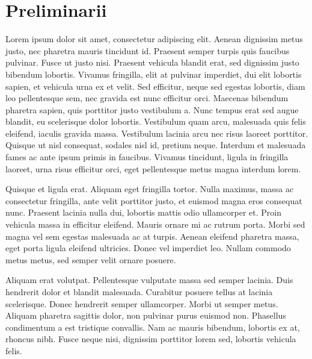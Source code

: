 \section{Preliminarii}

Lorem ipsum dolor sit amet, consectetur adipiscing elit. Aenean dignissim metus justo, nec pharetra mauris tincidunt id. Praesent semper turpis quis faucibus pulvinar. Fusce ut justo nisi. Praesent vehicula blandit erat, sed dignissim justo bibendum lobortis. Vivamus fringilla, elit at pulvinar imperdiet, dui elit lobortis sapien, et vehicula urna ex et velit. Sed efficitur, neque sed egestas lobortis, diam leo pellentesque sem, nec gravida est nunc efficitur orci. Maecenas bibendum pharetra sapien, quis porttitor justo vestibulum a. Nunc tempus erat sed augue blandit, eu scelerisque dolor lobortis. Vestibulum quam arcu, malesuada quis felis eleifend, iaculis gravida massa. Vestibulum lacinia arcu nec risus laoreet porttitor. Quisque ut nisl consequat, sodales nisl id, pretium neque. Interdum et malesuada fames ac ante ipsum primis in faucibus. Vivamus tincidunt, ligula in fringilla laoreet, urna risus efficitur orci, eget pellentesque metus magna interdum lorem.

Quisque et ligula erat. Aliquam eget fringilla tortor. Nulla maximus, massa ac consectetur fringilla, ante velit porttitor justo, et euismod magna eros consequat nunc. Praesent lacinia nulla dui, lobortis mattis odio ullamcorper et. Proin vehicula massa in efficitur eleifend. Mauris ornare mi ac rutrum porta. Morbi sed magna vel sem egestas malesuada ac at turpis. Aenean eleifend pharetra massa, eget porta ligula eleifend ultricies. Donec vel imperdiet leo. Nullam commodo metus metus, sed semper velit ornare posuere.

Aliquam erat volutpat. Pellentesque vulputate massa sed semper lacinia. Duis hendrerit dolor et blandit malesuada. Curabitur posuere tellus at lacinia scelerisque. Donec hendrerit semper ullamcorper. Morbi ut semper metus. Aliquam pharetra sagittis dolor, non pulvinar purus euismod non. Phasellus condimentum a est tristique convallis. Nam ac mauris bibendum, lobortis ex at, rhoncus nibh. Fusce neque nisi, dignissim porttitor lorem sed, lobortis vehicula felis.